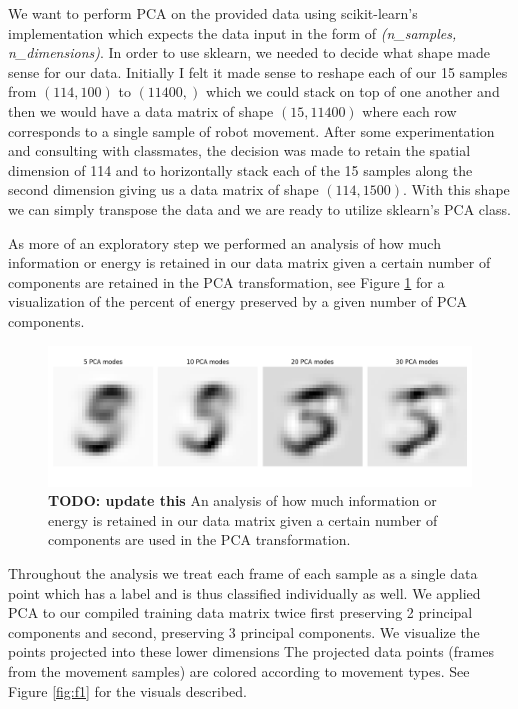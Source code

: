 \documentclass[11pt]{amsart}
\begin{document}
We want to perform PCA on the provided data using scikit-learn's implementation which expects the data input in the form of \textit{(n\_samples, n\_dimensions)}.
In order to use sklearn, we needed to decide what shape made sense for our data.
Initially I felt it made sense to reshape each of our 15 samples from $(114,100)$ to $(11400,)$ which we could stack on top of one another and then we would have a data matrix of shape $(15, 11400)$ where each row corresponds to a single sample of robot movement.
After some experimentation and consulting with classmates, the decision was made to retain the spatial dimension of 114 and to horizontally stack each of the 15 samples along the second dimension giving us a data matrix of shape $(114, 1500)$.
With this shape we can simply transpose the data and we are ready to utilize sklearn's PCA class.

As more of an exploratory step we performed an analysis of how much information or energy is retained in our data matrix given a certain number of components are retained in the PCA transformation, see Figure \ref{fig:f0} for a visualization of the percent of energy preserved by a given number of PCA components.

\begin{figure}[h]
	\centering
	\includegraphics[width=.5\textwidth]{../visualizations/digit_reconstruction.png}
 	\caption{ \textbf{TODO: update this} An analysis of how much information or energy is retained in our data matrix given a certain number of components are used in the PCA transformation.}\label{fig:f0}
\end{figure}

Throughout the analysis we treat each frame of each sample as a single data point which has a label and is thus classified individually as well.
We applied PCA to our compiled training data matrix twice first preserving 2 principal components and second, preserving 3 principal components.
We visualize the points projected into these lower dimensions
The projected data points (frames from the movement samples) are colored according to movement types.
See Figure \ref{fig:f1} for the visuals described.
\end{document}

